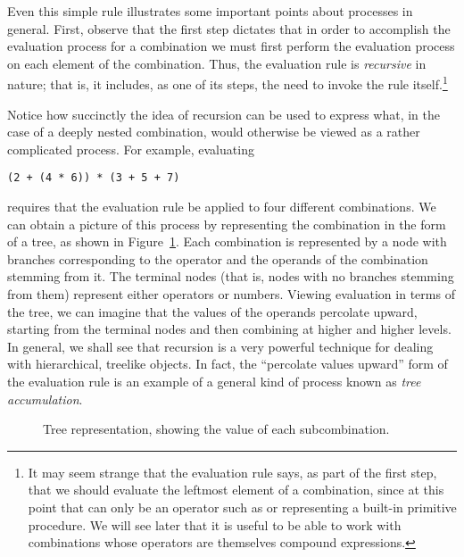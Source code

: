Even this simple rule illustrates some important points about processes in general. First, observe that the first step dictates that in order to accomplish the evaluation process for a combination we must first perform the evaluation process on each element of the combination. Thus, the evaluation rule is \textit{recursive} in nature; that is, it includes, as one of its steps, the need to invoke the rule itself.\footnote{It may seem strange that the evaluation rule says, as part of the first step, that we should evaluate the leftmost element of a combination, since at this point that can only be an operator such as \slate{+} or \slate{*} representing a built-in primitive procedure. We will see later that it is useful to be able to work with combinations whose operators are themselves compound expressions.}

Notice how succinctly the idea of recursion can be used to express what, in the case of a deeply nested combination, would otherwise be viewed as a rather complicated process. For example, evaluating

\begin{lstlisting}
(2 + (4 * 6)) * (3 + 5 + 7)
\end{lstlisting}

requires that the evaluation rule be applied to four different combinations. We can obtain a picture of this process by representing the combination in the form of a tree, as shown in Figure~\ref{fig:eval-tree}. Each combination is represented by a node with branches corresponding to the operator and the operands of the combination stemming from it. The terminal nodes (that is, nodes with no branches stemming from them) represent either operators or numbers. Viewing evaluation in terms of the tree, we can imagine that the values of the operands percolate upward, starting from the terminal nodes and then combining at higher and higher levels. In general, we shall see that recursion is a very powerful technique for dealing with hierarchical, treelike objects. In fact, the ``percolate values upward'' form of the evaluation rule is an example of a general kind of process known as \textit{tree accumulation}.

\begin{figure}[h]
\centering
{}
\caption{Tree representation, showing the value of each subcombination.}
\label{fig:eval-tree}
\end{figure}

